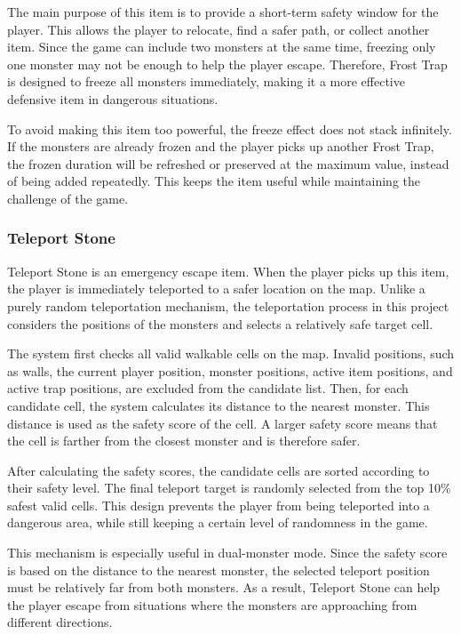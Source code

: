 The main purpose of this item is to provide a short-term safety window for the player. This allows the player to relocate, find a safer path, or collect another item. Since the game can include two monsters at the same time, freezing only one monster may not be enough to help the player escape. Therefore, Frost Trap is designed to freeze all monsters immediately, making it a more effective defensive item in dangerous situations.

To avoid making this item too powerful, the freeze effect does not stack infinitely. If the monsters are already frozen and the player picks up another Frost Trap, the frozen duration will be refreshed or preserved at the maximum value, instead of being added repeatedly. This keeps the item useful while maintaining the challenge of the game.

\subsubsection{Teleport Stone}

Teleport Stone is an emergency escape item. When the player picks up this item, the player is immediately teleported to a safer location on the map. Unlike a purely random teleportation mechanism, the teleportation process in this project considers the positions of the monsters and selects a relatively safe target cell.

The system first checks all valid walkable cells on the map. Invalid positions, such as walls, the current player position, monster positions, active item positions, and active trap positions, are excluded from the candidate list. Then, for each candidate cell, the system calculates its distance to the nearest monster. This distance is used as the safety score of the cell. A larger safety score means that the cell is farther from the closest monster and is therefore safer.

After calculating the safety scores, the candidate cells are sorted according to their safety level. The final teleport target is randomly selected from the top 10\% safest valid cells. This design prevents the player from being teleported into a dangerous area, while still keeping a certain level of randomness in the game.

This mechanism is especially useful in dual-monster mode. Since the safety score is based on the distance to the nearest monster, the selected teleport position must be relatively far from both monsters. As a result, Teleport Stone can help the player escape from situations where the monsters are approaching from different directions.

